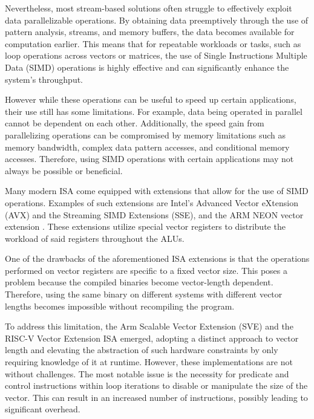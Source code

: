 %    
%    
%    
%   


Nevertheless, most stream-based solutions often struggle to effectively exploit data parallelizable operations. By obtaining data preemptively through the use of pattern analysis, streams, and memory buffers, the data becomes available for computation earlier. This means that for repeatable workloads or tasks, such as loop operations across vectors or matrices, the use of Single Instructions Multiple Data (\acrshort{SIMD}) operations is highly effective and can significantly enhance the system's throughput.

However while these operations can be useful to speed up certain applications, their use still has some limitations. For example, data being operated in parallel cannot be dependent on each other. Additionally, the speed gain from parallelizing operations can be compromised by memory limitations such as memory bandwidth, complex data pattern accesses, and conditional memory accesses. Therefore, using SIMD operations with certain applications may not always be possible or beneficial.

Many modern \acrfull{ISA} come equipped with extensions that allow for the use of \acrfull{SIMD} operations. Examples of such extensions are Intel's Advanced Vector eXtension (AVX) \cite{AVX} and the Streaming SIMD Extensions (SSE), and the ARM NEON vector extension \cite{arm-neon}. These extensions utilize special vector registers to distribute the workload of said registers throughout the \acrshort{ALUs}.

One of the drawbacks of the aforementioned \acrshort{ISA} extensions is that the operations performed on vector registers are specific to a fixed vector size. This poses a problem because the compiled binaries become vector-length dependent. Therefore, using the same binary on different systems with different vector lengths becomes impossible without recompiling the program. 

To address this limitation, the Arm Scalable Vector Extension (SVE) \cite{arm-paper} and the RISC-V Vector Extension ISA \cite{RVV} emerged, adopting a distinct approach to vector length and elevating the abstraction of such hardware constraints by only requiring knowledge of it at runtime. However, these implementations are not without challenges. The most notable issue is the necessity for predicate and control instructions within loop iterations to disable or manipulate the size of the vector. This can result in an increased number of instructions, possibly leading to significant overhead.


